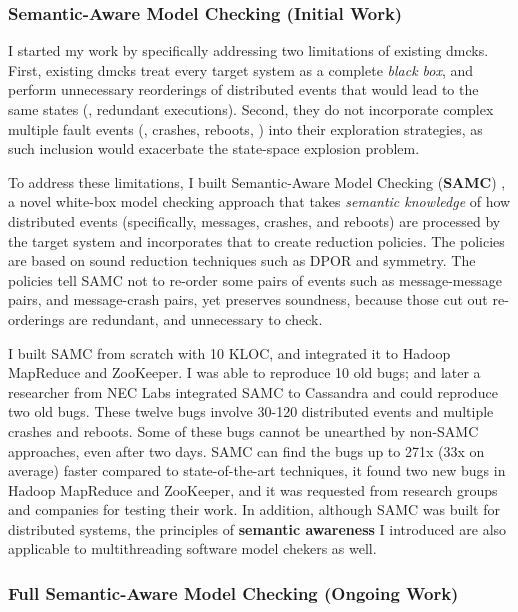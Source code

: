 \documentclass[10pt]{article}
\begin{document}
\subsubsection*{Semantic-Aware Model Checking (Initial Work)} 

I started my work by specifically addressing two limitations of existing dmcks.
First, existing dmcks treat every target system as a complete \textit{black
box}, and perform unnecessary reorderings of distributed events that would lead
to the same states (\ie, redundant executions). Second, they do not incorporate
complex multiple fault events (\eg, crashes, reboots, \etc) into their exploration
strategies, as such inclusion would exacerbate the state-space explosion
problem.

To address these limitations, I built Semantic-Aware Model Checking
(\textbf{SAMC}) \cite{Leesatapornwongsa+15-SamcIssta,Leesatapornwongsa+14-Samc},
a novel white-box model checking approach that takes \textit{semantic knowledge}
of how distributed events (specifically, messages, crashes, and reboots) are
processed by the target system and incorporates that to create reduction
policies. The policies are based on sound reduction techniques such as DPOR and
symmetry. The policies tell SAMC not to re-order some pairs of events such as
message-message pairs, and message-crash pairs, yet preserves soundness, because
those cut out re-orderings are redundant, and unnecessary to check.

I built SAMC from scratch with 10 KLOC, and integrated it to Hadoop MapReduce
and ZooKeeper. I was able to reproduce 10 old bugs; and later a researcher from
NEC Labs integrated SAMC to Cassandra and could reproduce two old bugs.
%
These twelve bugs involve 30-120 distributed events and multiple crashes and
reboots. Some of these bugs cannot be unearthed by non-SAMC approaches, even
after two days. SAMC can find the bugs up to 271x (33x on average) faster
compared to state-of-the-art techniques, it found two new bugs in Hadoop
MapReduce and ZooKeeper, and it was requested from research groups and companies
for testing their work. In addition, although SAMC was built for distributed
systems, the principles of \textbf{semantic awareness} I introduced are also
applicable to multithreading software model chekers as well.

\subsubsection*{Full Semantic-Aware Model Checking (Ongoing Work)} 
\end{document}

